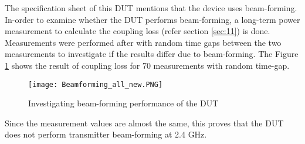 The specification sheet of this \acs{DUT} mentions that the device uses beam-forming. In-order to examine whether the \acs{DUT} performs beam-forming, a long-term power measurement to calculate the coupling loss (refer section \ref{sec:11}) is done. Measurements were performed after with random time gaps between the two measurements to investigate if the results differ due to beam-forming. The Figure \ref{fig:11} shows the result of coupling loss for 70 measurements with random time-gap. 

\begin{figure}[H]
\centering
\texttt{[image: Beamforming\_all\_new.PNG]}
\caption{Investigating beam-forming performance of the \acs{DUT}}
\label{fig:11} 
\end{figure}

Since the measurement values are almost the same, this proves that the \acs{DUT} does not perform transmitter beam-forming at 2.4 GHz.







